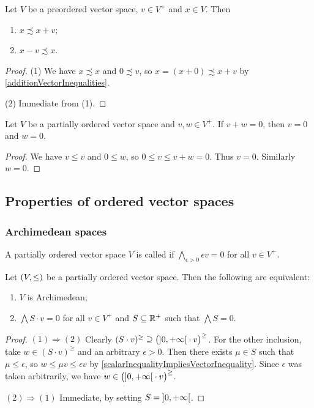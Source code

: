 \begin{lemma} \label{positiveVectorAddition}
Let $V$ be a preordered vector space, $v\in V^+$ and $x\in V$. Then
\begin{enumerate}
\item $x \precsim x+v$;
\item $x - v \precsim x$.
\end{enumerate}
\end{lemma}
\begin{proof}
(1) We have $x\precsim x$ and $0\precsim v$, so $x = (x+0)\precsim x+v$ by \ref{additionVectorInequalities}.

(2) Immediate from (1).
\end{proof}

\begin{lemma} \label{positiveElementsSumToZeroImpliesZero}
Let $V$ be a partially ordered vector space and $v,w\in V^+$. If $v+w = 0$, then $v = 0$ and $w = 0$.
\end{lemma}
\begin{proof}
We have $v \leq v$ and $0\leq w$, so $0\leq v\leq v+w = 0$. Thus $v = 0$. Similarly $w = 0$.
\end{proof}

\subsection{Properties of ordered vector spaces}
\subsubsection{Archimedean spaces}
\begin{definition}
A partially ordered vector space $V$ is called  if $\bigwedge_{\epsilon > 0}\epsilon v = 0$ for all $v\in V^+$.
\end{definition}

\begin{lemma} \label{ArchimedeanEquivalents}
Let $\sSet{V,\leq}$ be a partially ordered vector space. Then the following are equivalent:
\begin{enumerate}
\item $V$ is Archimedean;
\item $\bigwedge S\cdot v = 0$ for all $v\in V^+$ and $S\subseteq \mathbb{R}^+$ such that $\bigwedge S = 0$.
\end{enumerate}
\end{lemma}
\begin{proof}
$(1) \Rightarrow (2)$ Clearly $(S\cdot v)^\geq \supseteq \big( \interval[o]{0,+\infty}\cdot v\big)^\geq$. For the other inclusion, take $w\in (S\cdot v)^\geq$ and an arbitrary $\epsilon > 0$. Then there exists $\mu \in S$ such that $\mu \leq \epsilon$, so $w \leq \mu v \leq \epsilon v$ by \ref{scalarInequalityImpliesVectorInequality}. Since $\epsilon$ was taken arbitrarily, we have $w\in \big( \interval[o]{0,+\infty}\cdot v\big)^\geq$.

$(2) \Rightarrow (1)$ Immediate, by setting $S = \interval[o]{0,+\infty}$.
\end{proof}

